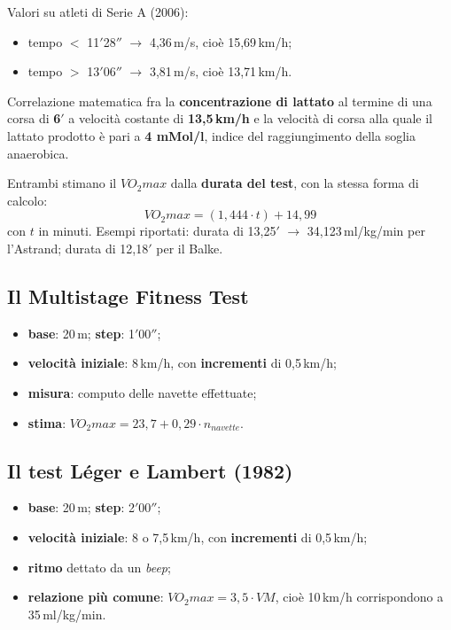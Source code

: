 Valori su atleti di Serie A (2006):
\begin{itemize}
  \item tempo $<$ 11$'$28$''$ $\rightarrow$ 4,36\,m/s, cioè 15,69\,km/h;
  \item tempo $>$ 13$'$06$''$ $\rightarrow$ 3,81\,m/s, cioè 13,71\,km/h.
\end{itemize}

Correlazione matematica fra la \textbf{concentrazione di lattato} al termine di una corsa di
\textbf{6$'$} a velocità costante di \textbf{13,5\,km/h} e la velocità di corsa alla quale il
lattato prodotto è pari a \textbf{4 mMol/l}, indice del raggiungimento della soglia anaerobica.

Entrambi stimano il $VO_2max$ dalla \textbf{durata del test}, con la stessa forma di calcolo:
\[
  VO_2max = (1{,}444 \cdot t) + 14{,}99
\]
con $t$ in minuti. Esempi riportati: durata di 13,25$'$ $\rightarrow$ 34,123\,ml/kg/min per
l'Astrand; durata di 12,18$'$ per il Balke.

\subsection{Il Multistage Fitness Test}

\begin{itemize}
  \item \textbf{base}: 20\,m; \textbf{step}: 1$'$00$''$;
  \item \textbf{velocità iniziale}: 8\,km/h, con \textbf{incrementi} di 0,5\,km/h;
  \item \textbf{misura}: computo delle navette effettuate;
  \item \textbf{stima}: $VO_2max = 23{,}7 + 0{,}29 \cdot n_{navette}$.
\end{itemize}

\subsection{Il test Léger e Lambert (1982)}

\begin{itemize}
  \item \textbf{base}: 20\,m; \textbf{step}: 2$'$00$''$;
  \item \textbf{velocità iniziale}: 8 o 7,5\,km/h, con \textbf{incrementi} di 0,5\,km/h;
  \item \textbf{ritmo} dettato da un \textit{beep};
  \item \textbf{relazione più comune}: $VO_2max = 3{,}5 \cdot VM$, cioè 10\,km/h corrispondono a
    35\,ml/kg/min.
\end{itemize}

